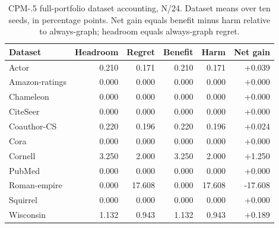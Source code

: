 \begin{table}[tbp]
\centering
\caption{CPM-.5 full-portfolio dataset accounting, N/24. Dataset means over ten seeds, in percentage points. Net gain equals benefit minus harm relative to always-graph; headroom equals always-graph regret.}
\label{tab:cpm_account_N_24}
\small
\setlength{\tabcolsep}{3pt}
\begin{tabular}{@{}lrrrrr@{}}
\toprule
Dataset & Headroom & Regret & Benefit & Harm & Net gain \\
\midrule
Actor & 0.210 & 0.171 & 0.210 & 0.171 & +0.039 \\
Amazon-ratings & 0.000 & 0.000 & 0.000 & 0.000 & +0.000 \\
Chameleon & 0.000 & 0.000 & 0.000 & 0.000 & +0.000 \\
CiteSeer & 0.000 & 0.000 & 0.000 & 0.000 & +0.000 \\
Coauthor-CS & 0.220 & 0.196 & 0.220 & 0.196 & +0.024 \\
Cora & 0.000 & 0.000 & 0.000 & 0.000 & +0.000 \\
Cornell & 3.250 & 2.000 & 3.250 & 2.000 & +1.250 \\
PubMed & 0.000 & 0.000 & 0.000 & 0.000 & +0.000 \\
Roman-empire & 0.000 & 17.608 & 0.000 & 17.608 & -17.608 \\
Squirrel & 0.000 & 0.000 & 0.000 & 0.000 & +0.000 \\
Wisconsin & 1.132 & 0.943 & 1.132 & 0.943 & +0.189 \\
\bottomrule
\end{tabular}
\end{table}

